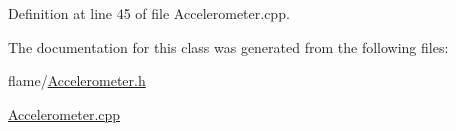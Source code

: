 Definition at line 45 of file Accelerometer.\-cpp.



The documentation for this class was generated from the following files\-:\begin{DoxyCompactItemize}
\item 
flame/\hyperlink{_accelerometer_8h}{Accelerometer.\-h}\item 
\hyperlink{_accelerometer_8cpp}{Accelerometer.\-cpp}\end{DoxyCompactItemize}

